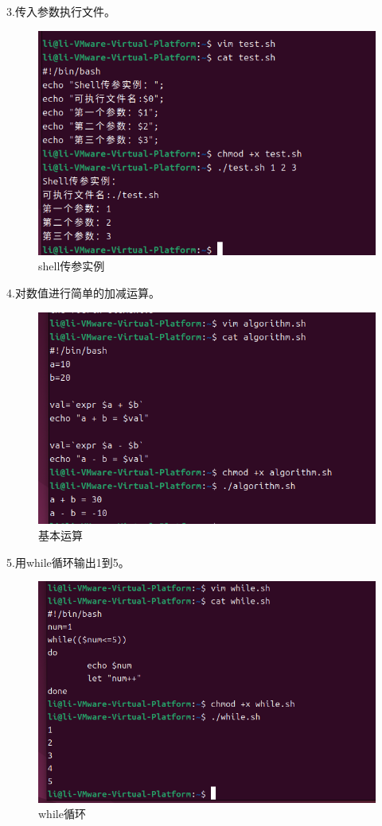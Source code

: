 \documentclass[a4paper, 12pt]{article}
\begin{document}
3.传入参数执行文件。
\begin{figure}[H]
  \centering
  \includegraphics[width=1\textwidth]{屏幕截图 2024-08-31 194338.png}
  \caption{shell传参实例}
\end{figure}

4.对数值进行简单的加减运算。
\begin{figure}[H]
  \centering
  \includegraphics[width=1\textwidth]{屏幕截图 2024-08-31 200646.png}
  \caption{基本运算}
    \end{figure}

5.用while循环输出1到5。
\begin{figure}[H]
  \centering
  \includegraphics[width=1\textwidth]{屏幕截图 2024-09-01 205922.png}
  \caption{while循环}
    \end{figure}
\end{document}
